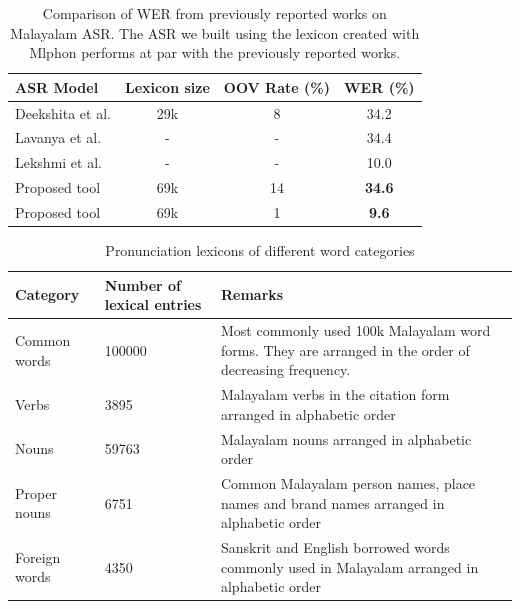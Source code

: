 \documentclass{ieeeaccess}
\begin{document}
\begin{table}[h]
	\caption{Comparison of WER from previously reported works on  Malayalam ASR. The ASR we built using the lexicon created with Mlphon performs at par with the previously reported works.}
	\label{asrcomparison}
	\begin{tabular}{lcc|c}
 \hline \hline
 \textbf{ASR Model} & \textbf{Lexicon size} & \textbf{OOV Rate (\%)}& \textbf{WER (\%)} \\
 \hline
 Deekshita et al.\cite{deekshitha} & 29k & 8 & 34.2 \\
 Lavanya et al. \cite{lavanya2018} & - & - & 34.4 \\
Lekshmi et al. \cite{lekshmi2021} & - & - & 10.0 \\
Proposed tool & 69k & 14& \textbf{34.6} \\
Proposed tool & 69k & 1& \textbf{9.6}\\

\hline	\end{tabular}
\end{table}


\begin{table}[ht]
\centering
	\begin{center}
		\begin{minipage}{\textwidth}
			\caption{Pronunciation lexicons of different word categories}
			\label{dictionaries}
			\begin{tabular}{@{}p{1.8cm}p{3cm}p{12cm}@{}}
				\hline
				\hline
				\textbf{Category} & \textbf{Number of lexical entries} & \textbf{Remarks}                                                                                                   \\
				\hline
				Common words      & 100000                             & Most commonly used 100k Malayalam word forms. They are arranged in the order of decreasing frequency. \\
				Verbs             & 3895                               & Malayalam verbs in the citation form arranged in alphabetic order                                                  \\
				Nouns             & 59763                              & Malayalam nouns arranged in alphabetic order                                                                       \\
				Proper nouns      & 6751                               & Common Malayalam person names, place names and brand names arranged in alphabetic order                            \\
				Foreign words     & 4350                               & Sanskrit and English borrowed words commonly used in Malayalam arranged in alphabetic order                        \\

				\hline
			\end{tabular}
		\end{minipage}
	\end{center}
\end{table}
\end{document}
